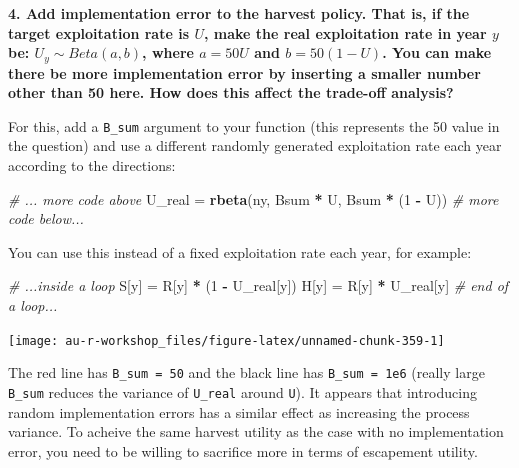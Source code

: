 \documentclass[]{book}
\newenvironment{Shaded}{\begin{snugshade}}{\end{snugshade}}
\newcommand{\KeywordTok}[1]{\textcolor[rgb]{0.13,0.29,0.53}{\textbf{#1}}}
\newcommand{\DecValTok}[1]{\textcolor[rgb]{0.00,0.00,0.81}{#1}}
\newcommand{\StringTok}[1]{\textcolor[rgb]{0.31,0.60,0.02}{#1}}
\newcommand{\CommentTok}[1]{\textcolor[rgb]{0.56,0.35,0.01}{\textit{#1}}}
\newcommand{\OperatorTok}[1]{\textcolor[rgb]{0.81,0.36,0.00}{\textbf{#1}}}
\newcommand{\NormalTok}[1]{#1}
\theoremstyle{definition}
\theoremstyle{definition}
\theoremstyle{definition}
\theoremstyle{remark}
\begin{document}
\textbf{4. Add implementation error to the harvest policy. That is, if
the target exploitation rate is \(U\), make the real exploitation rate
in year \(y\) be: \(U_y \sim Beta(a,b)\), where \(a = 50U\) and
\(b = 50(1-U)\). You can make there be more implementation error by
inserting a smaller number other than 50 here. How does this affect the
trade-off analysis?}

For this, add a \texttt{B\_sum} argument to your function (this
represents the 50 value in the question) and use a different randomly
generated exploitation rate each year according to the directions:

\begin{Shaded}
\begin{Highlighting}[]
\CommentTok{# ... more code above}
\NormalTok{U_real =}\StringTok{ }\KeywordTok{rbeta}\NormalTok{(ny, Bsum }\OperatorTok{*}\StringTok{ }\NormalTok{U, Bsum }\OperatorTok{*}\StringTok{ }\NormalTok{(}\DecValTok{1} \OperatorTok{-}\StringTok{ }\NormalTok{U))}
\CommentTok{# more code below...}
\end{Highlighting}
\end{Shaded}

You can use this instead of a fixed exploitation rate each year, for
example:

\begin{Shaded}
\begin{Highlighting}[]
\CommentTok{# ...inside a loop}
\NormalTok{S[y] =}\StringTok{ }\NormalTok{R[y] }\OperatorTok{*}\StringTok{ }\NormalTok{(}\DecValTok{1} \OperatorTok{-}\StringTok{ }\NormalTok{U_real[y])}
\NormalTok{H[y] =}\StringTok{ }\NormalTok{R[y] }\OperatorTok{*}\StringTok{ }\NormalTok{U_real[y]}
\CommentTok{# end of a loop...}
\end{Highlighting}
\end{Shaded}

\begin{center}\texttt{[image: au-r-workshop\_files/figure-latex/unnamed-chunk-359-1]} \end{center}

The red line has \texttt{B\_sum\ =\ 50} and the black line has
\texttt{B\_sum\ =\ 1e6} (really large \texttt{B\_sum} reduces the
variance of \texttt{U\_real} around \texttt{U}). It appears that
introducing random implementation errors has a similar effect as
increasing the process variance. To acheive the same harvest utility as
the case with no implementation error, you need to be willing to
sacrifice more in terms of escapement utility.
\end{document}
